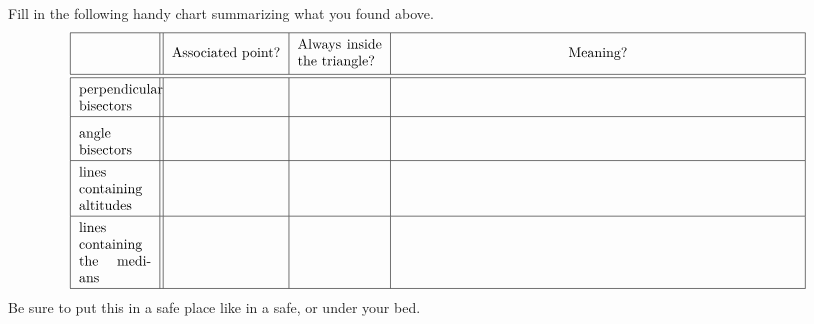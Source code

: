 \begin{prob}
Fill in the following handy chart summarizing what you found above. 
\[
\begin{tabular}{| l || c | c | c |}
\hline
  & Associated point? & \begin{minipage}{14ex}\minipad Always inside the triangle? \minipad\end{minipage} & Meaning? \\ \hline\hline 
\begin{minipage}{12ex}\minipad perpendicular \\ bisectors \minipad\end{minipage}  &\hspace{25mm} &\hspace{15mm}  & \hspace{100mm} \\ \hline
\begin{minipage}{12ex}\minipad angle \\ bisectors \minipad\end{minipage} & \rule[0mm]{0mm}{7mm}    &  & \\ \hline
\begin{minipage}{12ex}\minipad lines \\ containing altitudes \minipad\end{minipage} & \rule[0mm]{0mm}{7mm}    &  &  \\ \hline
\begin{minipage}{12ex}\minipad lines \\ containing the medians  \minipad\end{minipage} & \rule[0mm]{0mm}{7mm}   &  &   \\ \hline
\end{tabular}
\]
Be sure to put this in a safe place like in a safe, or under your bed.
\end{prob}
